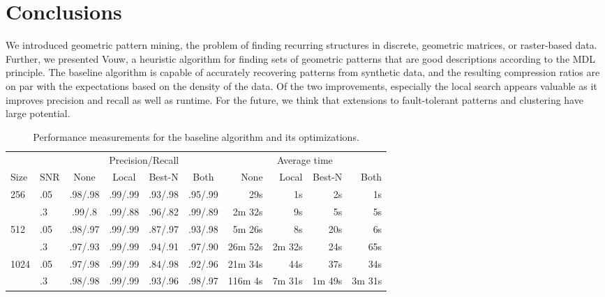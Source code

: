 \documentclass{llncs}
\begin{document}
\section{Conclusions}

We introduced geometric pattern mining, the problem of finding recurring structures in discrete, geometric matrices, or raster-based data. %
Further, we presented Vouw, a heuristic algorithm for finding sets of geometric patterns that are good descriptions according to the MDL principle. The baseline algorithm is capable of accurately recovering patterns from synthetic data, and the resulting compression ratios are on par with the expectations based on the density of the data. Of the two improvements, especially the local search appears valuable as it improves precision and recall as well as runtime. For the future, we think that extensions to fault-tolerant patterns and clustering have large potential.

\begin{table}[t]
\caption{Performance measurements for the baseline algorithm and its optimizations.}
\label{table:optimize}
\begin{tabular*}{\textwidth}{l @{\extracolsep{\fill}}lccccrrrr}
\toprule
 & & \multicolumn{4}{c}{Precision/Recall} & \multicolumn{4}{c}{Average time}\\
 \cmidrule(l){3-6} \cmidrule(l){7-10} 
 Size & SNR & None & Local & Best-N & Both & None & Local & Best-N & Both \\
\midrule
 256 & .05 & .98/.98 & .99/.99 & .93/.98 & .95/.99 & 29s & 1s & 2s & 1s \\
   & .3 &.99/.8 & .99/.88 & .96/.82 & .99/.89 & 2m 32s & 9s & 5s & 5s \\
 512 & .05 & .98/.97 & .99/.99 & .87/.97 & .93/.98 & 5m 26s & 8s & 20s & 6s \\
  & .3 &.97/.93 & .99/.99 & .94/.91 & .97/.90 & 26m 52s & 2m 32s & 24s & 65s \\
 1024 & .05 & .97/.98 & .99/.99 & .84/.98 & .92/.96 & 21m 34s & 44s & 37s & 34s \\
 & .3 &.98/.98 & .99/.99 & .93/.96 & .98/.97 & 116m 4s & 7m 31s & 1m 49s & 3m 31s \\
\bottomrule
\end{tabular*}
\end{table}
\end{document}
